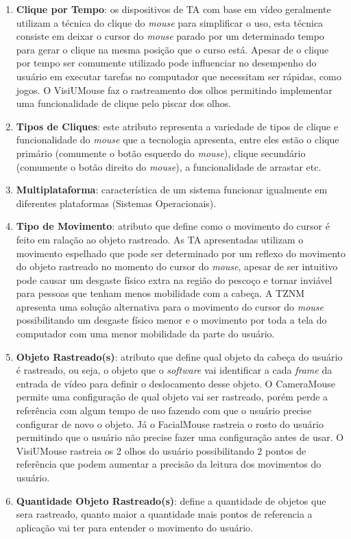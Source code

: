 \begin{enumerate}
\item \textbf{Clique por Tempo}: os dispositivos de TA com base em vídeo geralmente utilizam a técnica do clique do \textit{mouse} para simplificar o uso, esta técnica consiste em deixar o cursor do \textit{mouse} parado por um determinado tempo para gerar o clique na mesma posição que o curso está. Apesar de o clique por tempo ser comumente utilizado pode influenciar no desempenho do usuário em executar tarefas no computador que necessitam ser rápidas, como jogos. O VisiUMouse faz o rastreamento dos olhos permitindo implementar uma funcionalidade de clique pelo piscar dos olhos. 

\item \textbf{Tipos de Cliques}: este atributo representa a variedade de tipos de clique e funcionalidade do \textit{mouse} que a tecnologia apresenta, entre eles estão o clique primário (comumente o botão esquerdo do \textit{mouse}), clique secundário (comumente o botão direito do \textit{mouse}), a funcionalidade de arrastar etc.

\item \textbf{Multiplataforma}: característica de um sistema funcionar igualmente em diferentes plataformas (Sistemas Operacionais).

\item \textbf{Tipo de Movimento}: atributo que define como o movimento do cursor é feito em ralação ao objeto rastreado. As TA apresentadas utilizam o movimento espelhado que pode ser determinado por um reflexo do movimento do objeto rastreado no momento do cursor do \textit{mouse}, apesar de ser intuitivo pode causar um desgaste físico extra na região do pescoço e tornar inviável para pessoas que tenham menos mobilidade com a cabeça. A TZNM apresenta uma solução alternativa para o movimento do cursor do \textit{mouse} possibilitando um desgaste físico menor e o movimento por toda a tela do computador com uma menor mobilidade da parte do usuário.

\item \textbf{Objeto Rastreado(s)}: atributo que define qual objeto da cabeça do usuário é rastreado, ou seja, o objeto que o \textit{software} vai identificar a cada \textit{frame} da entrada de vídeo para definir o deslocamento desse objeto. O CameraMouse permite uma configuração de qual objeto vai ser rastreado, porém perde a referência com algum tempo de uso fazendo com que o usuário precise configurar de novo o objeto. Já o FacialMouse rastreia o rosto do usuário permitindo que o usuário não precise fazer uma configuração antes de usar. O VisiUMouse rastreia os 2 olhos do usuário possibilitando 2 pontos de referência que podem aumentar a precisão da leitura dos movimentos do usuário.

\item \textbf{Quantidade Objeto Rastreado(s)}: define a quantidade de objetos que sera rastreado, quanto maior a quantidade mais pontos de referencia a aplicação vai ter para entender o movimento do usuário.
\end{enumerate}

